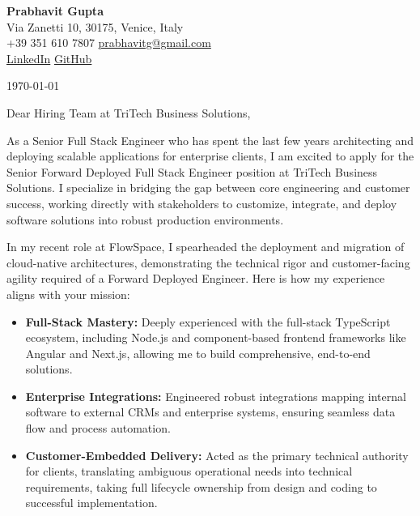 \documentclass[11pt,a4paper]{article}
\begin{document}
\begin{center}
    {\huge \textbf{Prabhavit Gupta}} \\
    \vspace{4pt}
    Via Zanetti 10, 30175, Venice, Italy \\
    +39 351 610 7807 \textbar{} \href{mailto:prabhavitg@gmail.com}{prabhavitg@gmail.com} \\
    \href{https://www.linkedin.com/in/prabhavit/}{LinkedIn} \textbar{} \href{https://github.com/prab-gupta}{GitHub}
\end{center}

\vspace{20pt}

\noindent \today

\vspace{10pt}

\noindent Dear Hiring Team at TriTech Business Solutions,

\vspace{10pt}

\noindent As a Senior Full Stack Engineer who has spent the last few years architecting and deploying scalable applications for enterprise clients, I am excited to apply for the Senior Forward Deployed Full Stack Engineer position at TriTech Business Solutions. I specialize in bridging the gap between core engineering and customer success, working directly with stakeholders to customize, integrate, and deploy software solutions into robust production environments. 

\noindent In my recent role at FlowSpace, I spearheaded the deployment and migration of cloud-native architectures, demonstrating the technical rigor and customer-facing agility required of a Forward Deployed Engineer. Here is how my experience aligns with your mission:

\begin{itemize}[leftmargin=*]
    \item \textbf{Full-Stack Mastery:} Deeply experienced with the full-stack TypeScript ecosystem, including Node.js and component-based frontend frameworks like Angular and Next.js, allowing me to build comprehensive, end-to-end solutions.
    \item \textbf{Enterprise Integrations:} Engineered robust integrations mapping internal software to external CRMs and enterprise systems, ensuring seamless data flow and process automation.
    \item \textbf{Customer-Embedded Delivery:} Acted as the primary technical authority for clients, translating ambiguous operational needs into technical requirements, taking full lifecycle ownership from design and coding to successful implementation.
\end{itemize}
\end{document}
